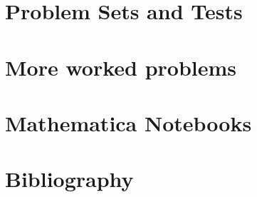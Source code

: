 \documentclass[12pt,leqno]{book}
\begin{document}
\part{Problem Sets and Tests}




\part{More worked problems}







\part{Mathematica Notebooks}


%
\part{Bibliography}




\end{document}
